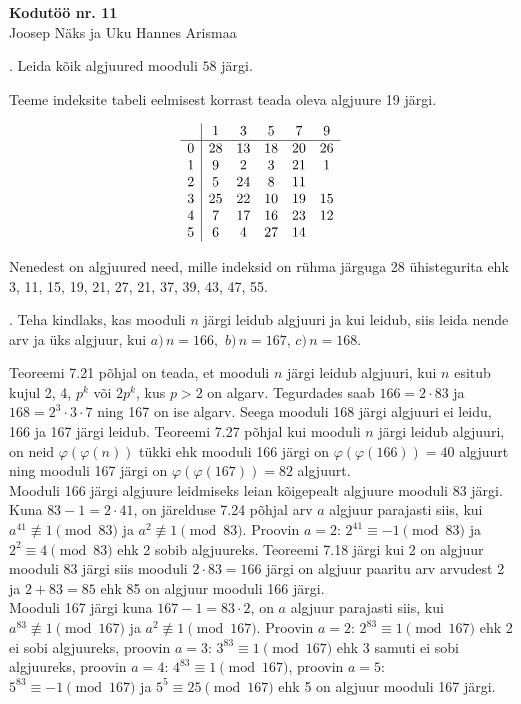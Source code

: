 \documentclass[a4paper, 10pt]{article}
\begin{document}
\begin{center}
\Large\textbf{Kodutöö nr. 11}\\
\small{Joosep Näks ja Uku Hannes Arismaa}
\end{center}

\bigskip

\bigskip

. Leida kõik algjuured mooduli $58$ järgi.

\bigskip
Teeme indeksite tabeli eelmisest korrast teada oleva algjuure 19 järgi.

\begin{equation*}
\begin{array}{c| c c c c c }
&1&3&5&7&9\\
\hline
0&28&13&18&20&26\\
1&9&2&3&21&1\\
2&5&24&8&11&\\
3&25&22&10&19&15\\
4&7&17&16&23&12\\
5&6&4&27&14&
\end {array}
\end{equation*}

Nenedest on algjuured need, mille indeksid on rühma järguga 28 ühistegurita ehk 3, 11, 15, 19, 21, 27, 21, 37, 39, 43, 47, 55.

\bigskip

. Teha kindlaks, kas mooduli $n$ järgi leidub algjuuri ja kui leidub, siis leida nende arv ja üks algjuur, kui $a)\, n=166,$ $b)\, n=167$, $c)\, n=168$.

\bigskip
Teoreemi 7.21 põhjal on teada, et mooduli $n$ järgi leidub algjuuri, kui $n$ esitub kujul 2, 4, $p^k$ või $2p^k$, kus $p>2$ on algarv. Tegurdades saab $166=2\cdot83$ ja $168=2^3\cdot3\cdot7$ ning 167 on ise algarv. Seega mooduli 168 järgi algjuuri ei leidu, 166 ja 167 järgi leidub. Teoreemi 7.27 põhjal kui mooduli $n$ järgi leidub algjuuri, on neid $\varphi(\varphi(n))$ tükki ehk mooduli 166 järgi on $\varphi(\varphi(166))=40$ algjuurt ning mooduli 167 järgi on $\varphi(\varphi(167))=82$ algjuurt.\\
Mooduli 166 järgi algjuure leidmiseks leian kõigepealt algjuure mooduli 83 järgi. Kuna $83-1=2\cdot41$, on järelduse 7.24 põhjal arv $a$ algjuur parajasti siis, kui $a^{41}\not\equiv1\pmod{83}$ ja $a^2\not\equiv1\pmod{83}$. Proovin $a=2$: $2^{41}\equiv-1\pmod{83}$ ja $2^{2}\equiv4\pmod{83}$ ehk 2 sobib algjuureks. Teoreemi 7.18 järgi kui 2 on algjuur mooduli 83 järgi siis mooduli $2\cdot83=166$ järgi on algjuur paaritu arv arvudest 2 ja $2+83=85$ ehk 85 on algjuur mooduli 166 järgi.\\
Mooduli 167 järgi kuna $167-1=83\cdot2$, on $a$ algjuur parajasti siis, kui \mbox{$a^{83}\not\equiv1\pmod{167}$} ja \mbox{$a^2\not\equiv1\pmod{167}$}. Proovin $a=2$: $2^{83}\equiv1\pmod{167}$ ehk 2 ei sobi algjuureks, proovin $a=3$: $3^{83}\equiv1\pmod{167}$ ehk 3 samuti ei sobi algjuureks, proovin $a=4$: $4^{83}\equiv1\pmod{167}$, proovin $a=5$: $5^{83}\equiv-1\pmod{167}$ ja $5^5\equiv25\pmod{167}$ ehk 5 on algjuur mooduli 167 järgi.
\bigskip
\end{document}
